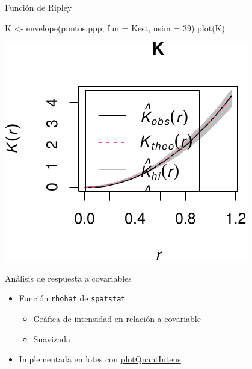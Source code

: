\documentclass[
  11pt,
  ignorenonframetext,
]{beamer}
\newenvironment{Shaded}{}{}
\newcommand{\AttributeTok}[1]{\textcolor[rgb]{0.49,0.56,0.16}{#1}}
\newcommand{\DecValTok}[1]{\textcolor[rgb]{0.25,0.63,0.44}{#1}}
\newcommand{\FunctionTok}[1]{\textcolor[rgb]{0.02,0.16,0.49}{#1}}
\newcommand{\NormalTok}[1]{#1}
\newcommand{\OtherTok}[1]{\textcolor[rgb]{0.00,0.44,0.13}{#1}}
\providecommand{\tightlist}{%
  \setlength{\itemsep}{0pt}\setlength{\parskip}{0pt}}
\begin{document}
\begin{frame}[fragile]{Función de Ripley}
\protect\hypertarget{funciuxf3n-de-ripley-2}{}
\begin{Shaded}
\begin{Highlighting}[]
\NormalTok{K }\OtherTok{\textless{}{-}} \FunctionTok{envelope}\NormalTok{(puntos.ppp, }\AttributeTok{fun =}\NormalTok{ Kest, }\AttributeTok{nsim =} \DecValTok{39}\NormalTok{)}
\FunctionTok{plot}\NormalTok{(K)}
\end{Highlighting}
\end{Shaded}

\begin{center}\includegraphics{Tutorial-spatstat_files/figure-beamer/unnamed-chunk-18-1} \end{center}
\end{frame}

\begin{frame}[fragile]{Análisis de respuesta a covariables}
\protect\hypertarget{anuxe1lisis-de-respuesta-a-covariables}{}
\begin{itemize}
\item
  Función \texttt{rhohat} de \texttt{spatstat}

  \begin{itemize}
  \tightlist
  \item
    Gráfica de intensidad en relación a covariable
  \item
    Suavizada
  \end{itemize}
\item
  Implementada en lotes con
  \href{Funciones-spatstat/plotQuantIntens.R}{plotQuantIntens}
\end{itemize}
\end{frame}
\end{document}
